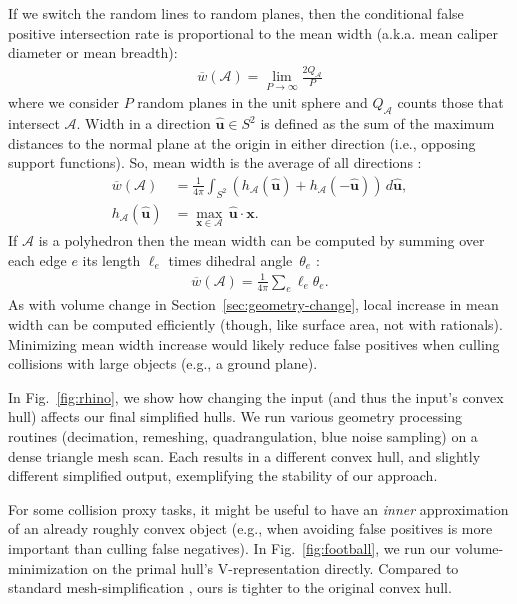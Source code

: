 \documentclass{egpubl}
\newcommand{\newhl}[1]{#1}
\newcommand{\Vrep}{V-representation\xspace}
\begin{document}
\newhl{
If we switch the random lines to random planes, then the conditional false positive intersection rate is proportional to the mean width (a.k.a. mean caliper diameter or mean breadth):
\begin{align}
   \overline{w}(\mathcal{A}) =  
   \lim_{P \rightarrow \infty} \frac{2 Q_\mathcal{A}}{P}
\end{align}
where we consider $P$ random planes in the unit sphere and $Q_\mathcal{A}$ counts those that intersect $\mathcal{A}$. 
Width in a direction $\hat{\mathbf{u}} \in S^2$ is defined as the sum of the maximum distances to the normal plane at the origin in either direction (i.e., opposing support functions).
So, mean width is the average of all directions
\cite{moszynska2006selected}:
\begin{align}
\overline{w}(\mathcal{A}) &= \frac{1}{4 \pi} \int_{S^2} 
\left( h_\mathcal{A}(\hat{\mathbf{u}}) + 
h_\mathcal{A}(-\hat{\mathbf{u}}) \right)\, d\hat{\mathbf{u}},\\
h_\mathcal{A}(\hat{\mathbf{u}}) &= \max_{\mathbf{x} \in \mathcal{A} } \, \hat{\mathbf{u}} \cdot \mathbf{x}.
\end{align}
If $\mathcal{A}$ is a polyhedron then the mean width can be computed by summing over each edge $e$ its length $\ell_e$ times dihedral angle~$\theta_e$ \cite{Miles1969,achilleMSE}:
\begin{align}
\overline{w}(\mathcal{A}) = \frac{1}{4 \pi} \sum_{e}
\ell_e \theta_e.
\end{align}
As with volume change in Section~\ref{sec:geometry-change},
local increase in mean width can be computed efficiently (though, like surface area, not with rationals).
Minimizing mean width increase would likely reduce false positives when culling collisions with large objects (e.g., a ground plane).
}



\newhl{%
In Fig.~\ref{fig:rhino}, we show how changing the input (and thus the input's convex hull) affects our final simplified hulls.
We run various geometry processing routines (decimation, remeshing, quadrangulation, blue noise sampling) on a dense triangle mesh scan. Each results in a different convex hull, and slightly different simplified output, exemplifying the stability of our approach.
}


For some collision proxy tasks, it might be useful to have an \emph{inner} approximation of an already roughly convex object (e.g., when avoiding false positives is more important than culling false negatives).
In Fig.~\ref{fig:football}, we run our volume-minimization on the primal hull's \Vrep directly. Compared to standard mesh-simplification \cite{GarlandH97}, ours is tighter to the original convex hull.
\end{document}
